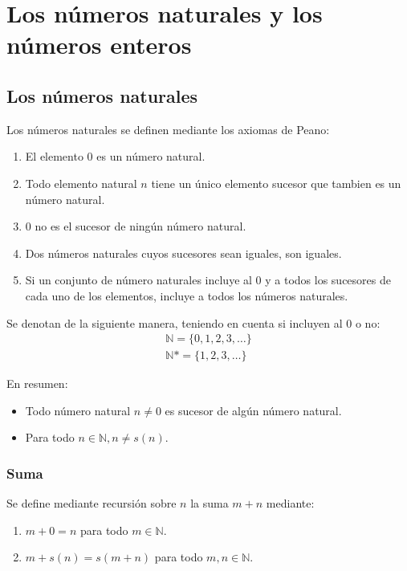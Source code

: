 \chapter{Los números naturales y los números enteros}

\section{Los números naturales}

Los números naturales se definen mediante los axiomas de Peano:
\begin{enumerate}
 \item El elemento 0 es un número natural.
 \item Todo elemento natural $n$ tiene un único elemento sucesor que tambien es
un número natural.
 \item 0 no es el sucesor de ningún número natural.
 \item Dos números naturales cuyos sucesores sean iguales, son iguales.
 \item Si un conjunto de número naturales incluye al 0 y a todos los sucesores
de cada uno de los elementos, incluye a todos los números naturales.
\end{enumerate}

Se denotan de la siguiente manera, teniendo en cuenta si incluyen al 0 o no:
\begin{align*}
 \mathbb{N}=\{0,1,2,3,\ldots\} \\
 \mathbb{N}*=\{1,2,3,\ldots\}
\end{align*}

En resumen:
\begin{itemize}
  \item Todo número natural $n\neq0$ es sucesor de algún número natural.
  \item Para todo $n \in \mathbb{N}, n \neq s(n)$.
\end{itemize}

\subsection{Suma}

Se define mediante recursión sobre $n$ la suma $m+n$ mediante:
\begin{enumerate}
  \item $m+0=n$ para todo $m \in \mathbb{N}$.
  \item $m+s(n)=s(m+n)$ para todo $m,n \in \mathbb{N}$.
\end{enumerate}


